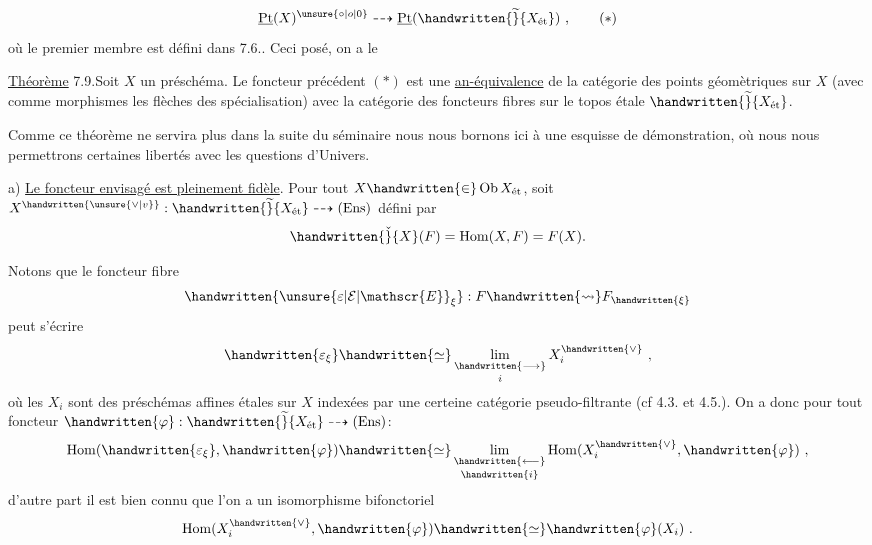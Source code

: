 \clearpage
{}
\begingroup
\makeatletter\tagsleft@true\makeatother
\[
\underline{\mathrm{Pt}}(X)^{\unsure{\circ|o|0}}\dashrightarrow
\underline{\mathrm{Pt}}(\handwritten{\widetilde}{X_{\text{ét}}})\ ,
\tag*{$(*)$}
\]
où le premier membre est défini dans 7.6.. Ceci posé, on a le

\noindent\uline{Théorème} 7.9.\quad Soit $X$ un préschéma. Le foncteur précédent $(*)$ est une \uline{an-équivalence} de la catégorie des points géomètriques sur $X$ (avec comme morphismes les flèches des spécialisation) avec la catégorie des foncteurs fibres sur le topos étale $\handwritten{\widetilde}{X_{\text{ét}}}$.

Comme ce théorème ne servira plus dans la suite du séminaire nous nous bornons ici à une esquisse de démonstration, où nous nous permettrons certaines libertés avec les questions d'Univers.

a) \uline{Le foncteur envisagé est pleinement fidèle}. Pour tout $X\handwritten{\in}\operatorname{Ob} X_{\text{ét}}$, soit $X^{\handwritten{\unsure{\vee|v}}}: \handwritten{\widetilde}{X_{\text{ét}}} \dashrightarrow (\mathrm{Ens})$ défini par
\[
\handwritten{\check}{X}(F) = \operatorname{Hom}(X,F) = F(X).
\]

\noindent Notons que le foncteur fibre
\[
\handwritten{\unsure{\varepsilon|\mathcal{E}|\mathscr{E}}_{\xi}} : F \handwritten{\rightsquigarrow} F_{\handwritten{\xi}}
\]
peut s'écrire
\[
\handwritten{\varepsilon_{\xi}} \handwritten{\simeq} \mathop{\underset{\handwritten{\longrightarrow}}{\mathrm{lim}}}\limits_i X_i^{\handwritten{\vee}}\ ,
\]
où les $X_i$ sont des préschémas affines étales sur $X$ indexées par une certeine catégorie pseudo-filtrante (cf 4.3. et 4.5.). On a donc pour tout foncteur $\handwritten{\varphi}: \handwritten{\widetilde}{X_{\text{ét}}} \dashrightarrow (\mathrm{Ens})$:
\[
\operatorname{Hom}(\handwritten{\varepsilon_{\xi}},\handwritten{\varphi}) \handwritten{\simeq} \mathop{\underset{\handwritten{\longleftarrow}}{\mathrm{lim}}}\limits_{\handwritten{i}} \operatorname{Hom}(X_i^{\handwritten{\vee}},\handwritten{\varphi})\ ,
\]
d'autre part il est bien connu que l'on a un isomorphisme bifonctoriel
\[
\operatorname{Hom}(X_i^{\handwritten{\vee}},\handwritten{\varphi}) \handwritten{\simeq} \handwritten{\varphi}(X_i)\ .
\]

\endgroup

